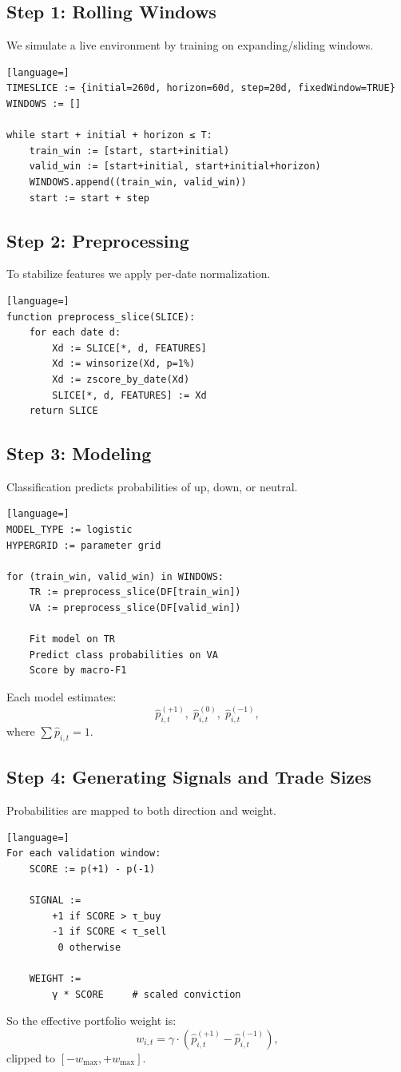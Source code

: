 \documentclass[11pt]{article}
\begin{document}
    \subsection*{Step 1: Rolling Windows}
    We simulate a live environment by training on expanding/sliding windows.
    \begin{lstlisting}[language=]
TIMESLICE := {initial=260d, horizon=60d, step=20d, fixedWindow=TRUE}
WINDOWS := []

while start + initial + horizon ≤ T:
    train_win := [start, start+initial)
    valid_win := [start+initial, start+initial+horizon)
    WINDOWS.append((train_win, valid_win))
    start := start + step
    \end{lstlisting}

    \subsection*{Step 2: Preprocessing}
    To stabilize features we apply per-date normalization.
    \begin{lstlisting}[language=]
function preprocess_slice(SLICE):
    for each date d:
        Xd := SLICE[*, d, FEATURES]
        Xd := winsorize(Xd, p=1%)
        Xd := zscore_by_date(Xd)
        SLICE[*, d, FEATURES] := Xd
    return SLICE
    \end{lstlisting}

    \subsection*{Step 3: Modeling}
    Classification predicts probabilities of up, down, or neutral.
    \begin{lstlisting}[language=]
MODEL_TYPE := logistic
HYPERGRID := parameter grid

for (train_win, valid_win) in WINDOWS:
    TR := preprocess_slice(DF[train_win])
    VA := preprocess_slice(DF[valid_win])

    Fit model on TR
    Predict class probabilities on VA
    Score by macro-F1
    \end{lstlisting}
    Each model estimates:
    \[
       \hat{p}_{i,t}^{(+1)}, \; \hat{p}_{i,t}^{(0)}, \; \hat{p}_{i,t}^{(-1)},
    \]
    where $\sum \hat{p}_{i,t} = 1$.

    \subsection*{Step 4: Generating Signals and Trade Sizes}
    Probabilities are mapped to both direction and weight.
    \begin{lstlisting}[language=]
For each validation window:
    SCORE := p(+1) - p(-1)

    SIGNAL :=
        +1 if SCORE > τ_buy
        -1 if SCORE < τ_sell
         0 otherwise

    WEIGHT :=
        γ * SCORE     # scaled conviction
    \end{lstlisting}
    So the effective portfolio weight is:
    \[
       w_{i,t} = \gamma \cdot \left(\hat{p}_{i,t}^{(+1)} - \hat{p}_{i,t}^{(-1)}\right),
    \]
    clipped to $[-w_{\max}, +w_{\max}]$.
\end{document}
